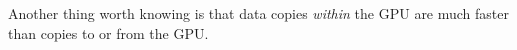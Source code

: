 \documentclass[12pt]{article}
\begin{document}





Another thing worth knowing is that data copies {\it within} the GPU are much faster than copies to or from the GPU.








\end{document}
